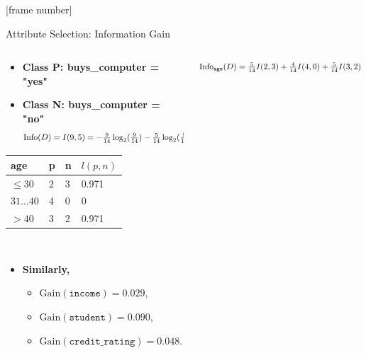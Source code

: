 \documentclass[aspectratio=169,t,table]{beamer}
\begin{document}
  {
    [frame number]
    \begin{frame}{Attribute Selection: Information Gain}
      \begin{columns}
        \begin{column}{0.45\textwidth}
          \begin{itemize}
            \item \textbf{Class P: buys\_computer = "yes"}
            \item \textbf{Class N: buys\_computer = "no"}
            \begin{align*}
              \resizebox{7cm}{!}{%
                $\text{Info}(D) = I(9,5) = - \frac{9}{14}\log_2(\frac{9}{14})-\frac{5}{14} \log_2(\frac{5}{14}) = 0.94$
              }
            \end{align*}
          \end{itemize}
          \centering
          \begin{tabular}{|l|l|l|l|}
            \hline
            \cellcolor{blue!20}age & \cellcolor{blue!20}p & \cellcolor{blue!20}n & \cellcolor{blue!20}$l(p,n)$ \\\hline
            \cellcolor{yellow!20}$\leq 30$ & 2 & 3 & 0.971 \\\hline
            \cellcolor{yellow!20}$31\ldots40$ & 4 & 0 & 0 \\\hline
            \cellcolor{yellow!20}$>40$ & 3 & 2 & 0.971 \\\hline
          \end{tabular}\\[0.2cm]
        \begin{itemize}
          \item \textbf{Similarly,}
          \begin{itemize}
            \item $\text{Gain}(\texttt{income}) = 0.029$,
            \item $\text{Gain}(\texttt{student}) = 0.090$,
            \item $\text{Gain}(\texttt{credit\_rating}) = 0.048$.
          \end{itemize}
        \end{itemize}
        \end{column}
        \begin{column}{0.45\textwidth}
          \vspace{-1.3cm}
          \begin{align*}
            \resizebox{7cm}{!}{%
              $\text{Info}_{\texttt{age}}(D) = \frac{5}{14}I(2,3) + \frac{4}{14} I(4,0) + \frac{5}{14} I(3,2) = 0.694$.
}
\end{align*}
\end{column}
\end{columns}
\end{frame}}
\end{document}
